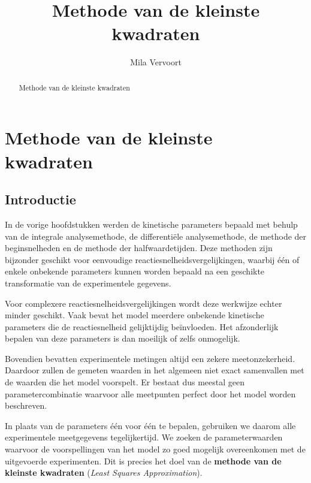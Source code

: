 \documentclass{ximera}
\title{Methode van de kleinste kwadraten}
\author{Mila Vervoort}
\begin{document}
\begin{abstract}
    Methode van de kleinste kwadraten
\end{abstract}
\maketitle
\label{xim:Integrale analysemethode}

\section*{Methode van de kleinste kwadraten}
\label{Methode van de kleinste kwadraten}


\subsection*{Introductie}

In de vorige hoofdstukken werden de kinetische parameters bepaald met behulp van de integrale analysemethode, de differentiële analysemethode, de methode der beginsnelheden en de methode der halfwaardetijden. Deze methoden zijn bijzonder geschikt voor eenvoudige reactiesnelheidsvergelijkingen, waarbij één of enkele onbekende parameters kunnen worden bepaald na een geschikte transformatie van de experimentele gegevens.

Voor complexere reactiesnelheidsvergelijkingen wordt deze werkwijze echter minder geschikt. Vaak bevat het model meerdere onbekende kinetische parameters die de reactiesnelheid gelijktijdig beïnvloeden. Het afzonderlijk bepalen van deze parameters is dan moeilijk of zelfs onmogelijk.

Bovendien bevatten experimentele metingen altijd een zekere meetonzekerheid. Daardoor zullen de gemeten waarden in het algemeen niet exact samenvallen met de waarden die het model voorspelt. Er bestaat dus meestal geen parametercombinatie waarvoor alle meetpunten perfect door het model worden beschreven.

In plaats van de parameters één voor één te bepalen, gebruiken we daarom alle experimentele meetgegevens tegelijkertijd. We zoeken de parameterwaarden waarvoor de voorspellingen van het model zo goed mogelijk overeenkomen met de uitgevoerde experimenten. Dit is precies het doel van de \textbf{methode van de kleinste kwadraten} (\textit{Least Squares Approximation}).
\end{document}
